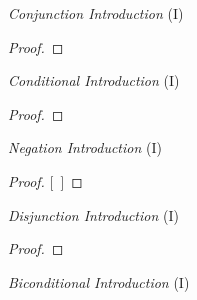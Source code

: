 \documentclass[a4paper, 11pt]{article} %
\begin{document}
\iffalse

\begin{multicols}{2}


\textit{Conjunction Introduction} (\eand I) \vspace{-1em}
\begin{proof}
	 
	 
\end{proof}

\vspace{1em}

\textit{Conditional Introduction} (\eif I) \vspace{-1em}
\begin{proof}
	\open
	\close
\end{proof}

\vspace{0.6em}

\textit{Negation Introduction} (\enot I) \vspace{-1em}
\begin{proof}
\open
	\metaA{}    %
	\metaB{}
\close
{}[\ ]{\enot\metaA{}}
\end{proof}

\vspace{0.6em}

\textit{Disjunction Introduction} (\eor I) \vspace{-1em}

\begin{proof}
\end{proof}

\vspace{0.6em}

\textit{Biconditional Introduction} (\eiff I) \vspace{-1em}

\begin{fitchproof}
	\open
		 
	\close
\breakline
	\open
		 
	\close
\end{fitchproof}



\end{multicols}
\end{document}
